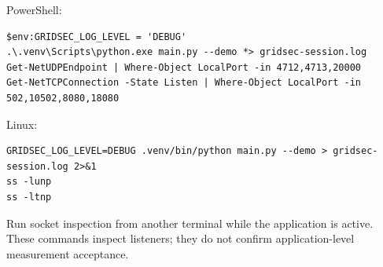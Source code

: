 \par\noindent\begin{minipage}{\linewidth}
PowerShell:
\begin{lstlisting}[title={POWERSHELL}]
$env:GRIDSEC_LOG_LEVEL = 'DEBUG'
.\.venv\Scripts\python.exe main.py --demo *> gridsec-session.log
Get-NetUDPEndpoint | Where-Object LocalPort -in 4712,4713,20000
Get-NetTCPConnection -State Listen | Where-Object LocalPort -in 502,10502,8080,18080
\end{lstlisting}
\end{minipage}\par
\par\noindent\begin{minipage}{\linewidth}
Linux:
\begin{lstlisting}[title={BASH}]
GRIDSEC_LOG_LEVEL=DEBUG .venv/bin/python main.py --demo > gridsec-session.log 2>&1
ss -lunp
ss -ltnp
\end{lstlisting}
\end{minipage}\par
Run socket inspection from another terminal while the application is active. These commands inspect listeners; they do not confirm application-level measurement acceptance.


